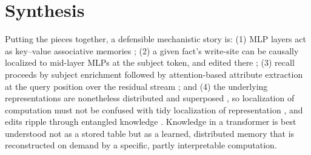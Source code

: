\documentclass[11pt]{article}
\begin{document}
\section{Synthesis}
Putting the pieces together, a defensible mechanistic story is: (1) MLP layers act as key--value associative memories \citep{geva2021kv,geva2022promote}; (2) a given fact's write-site can be causally localized to mid-layer MLPs at the subject token, and edited there \citep{meng2022rome,meng2022memit}; (3) recall proceeds by subject enrichment followed by attention-based attribute extraction at the query position \citep{geva2023dissecting} over the residual stream \citep{elhage2021mathematical}; and (4) the underlying representations are nonetheless distributed and superposed \citep{elhage2022superposition,cunningham2023sparse}, so localization of computation must not be confused with tidy localization of representation \citep{hase2023does}, and edits ripple through entangled knowledge \citep{cohen2023ripple}. Knowledge in a transformer is best understood not as a stored table but as a learned, distributed memory that is reconstructed on demand by a specific, partly interpretable computation.



\end{document}
